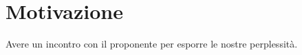 \documentclass[../Riunione16-01-07.tex]{subfiles}
\begin{document}
\section{Motivazione}
Avere un incontro con il proponente per esporre le nostre perplessità.
\end{document}
